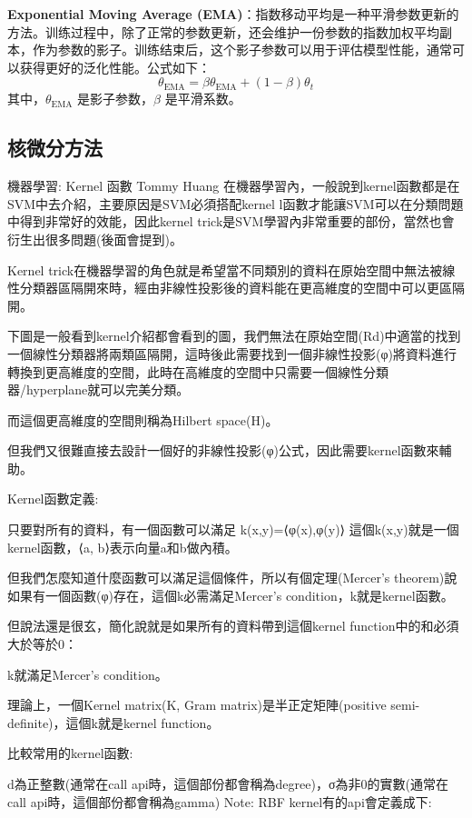 \documentclass[12pt,a4paper]{amsart}
\begin{document}
\textbf{Exponential Moving Average (EMA)}：指数移动平均是一种平滑参数更新的方法。训练过程中，除了正常的参数更新，还会维护一份参数的指数加权平均副本，作为参数的影子。训练结束后，这个影子参数可以用于评估模型性能，通常可以获得更好的泛化性能。公式如下：
\begin{equation}
\theta_{\text{EMA}} = \beta \theta_{\text{EMA}} + (1 - \beta) \theta_t
\end{equation}
其中，$\theta_{\text{EMA}}$ 是影子参数，$\beta$ 是平滑系数。

\subsection{核微分方法}

機器學習: Kernel 函數
Tommy Huang
在機器學習內，一般說到kernel函數都是在SVM中去介紹，主要原因是SVM必須搭配kernel l函數才能讓SVM可以在分類問題中得到非常好的效能，因此kernel trick是SVM學習內非常重要的部份，當然也會衍生出很多問題(後面會提到)。

Kernel trick在機器學習的角色就是希望當不同類別的資料在原始空間中無法被線性分類器區隔開來時，經由非線性投影後的資料能在更高維度的空間中可以更區隔開。

下圖是一般看到kernel介紹都會看到的圖，我們無法在原始空間(Rd)中適當的找到一個線性分類器將兩類區隔開，這時後此需要找到一個非線性投影(φ)將資料進行轉換到更高維度的空間，此時在高維度的空間中只需要一個線性分類器/hyperplane就可以完美分類。


而這個更高維度的空間則稱為Hilbert space(H)。

但我們又很難直接去設計一個好的非線性投影(φ)公式，因此需要kernel函數來輔助。

Kernel函數定義:

只要對所有的資料，有一個函數可以滿足
k(x,y)=⟨φ(x),φ(y)⟩
這個k(x,y)就是一個kernel函數，⟨a, b⟩表示向量a和b做內積。

但我們怎麼知道什麼函數可以滿足這個條件，所以有個定理(Mercer’s theorem)說如果有一個函數(φ)存在，這個k必需滿足Mercer’s condition，k就是kernel函數。

但說法還是很玄，簡化說就是如果所有的資料帶到這個kernel function中的和必須大於等於0：


k就滿足Mercer’s condition。

理論上，一個Kernel matrix(K, Gram matrix)是半正定矩陣(positive semi-definite)，這個k就是kernel function。


比較常用的kernel函數:


d為正整數(通常在call api時，這個部份都會稱為degree)，σ為非0的實數(通常在call api時，這個部份都會稱為gamma)
Note: RBF kernel有的api會定義成下:
\end{document}
